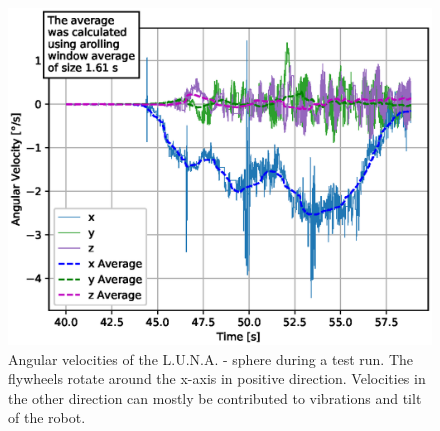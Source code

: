 
\begin{figure}
\centering
\includegraphics[width=\textwidth]{./plotsAndScripts/angVel-2020-01-29-16-14-54/ang-vel}
\caption{Angular velocities of the L.U.N.A. - sphere during a test run. The flywheels rotate around the x-axis in positive direction. Velocities in the other direction can mostly be contributed to vibrations and tilt of the robot.}
\label{sec:experimentalResults:COAMDrive:fig:angvel}
\end{figure}